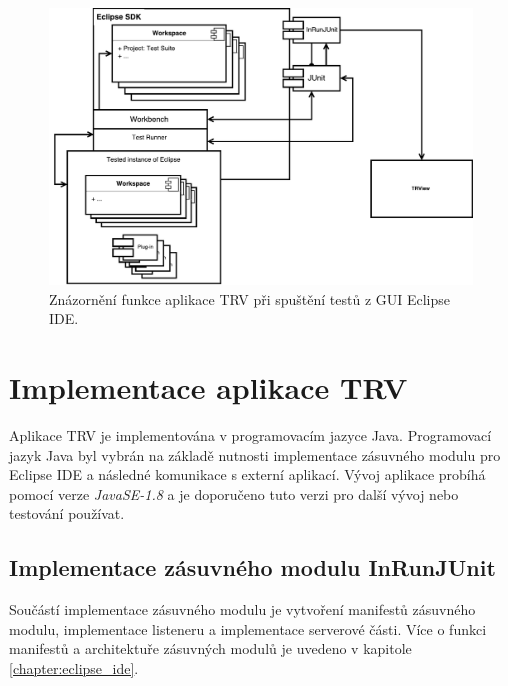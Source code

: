     \begin{figure}[h]
      \includegraphics[width=\textwidth, center]{obrazky-figures/TRV_run_from_gui.pdf}
      \caption{Znázornění funkce aplikace TRV při spuštění testů z GUI Eclipse IDE.}
      \label{fig:TRV_run_from_gui}
    \end{figure}


  \section{Implementace aplikace TRV}
  Aplikace TRV je implementována v programovacím jazyce Java. Programovací jazyk Java byl vybrán na základě nutnosti implementace zásuvného modulu pro Eclipse IDE a následné komunikace s externí aplikací. Vývoj aplikace probíhá pomocí verze \emph{JavaSE-1.8} a je doporučeno tuto verzi pro další vývoj nebo testování používat.

    \subsection{Implementace zásuvného modulu InRunJUnit}
    Součástí implementace zásuvného modulu je vytvoření manifestů zásuvného modulu, implementace listeneru a implementace serverové části. Více o funkci manifestů a architektuře zásuvných modulů je uvedeno v kapitole \ref{chapter:eclipse_ide}.
      
